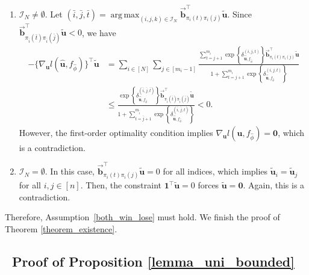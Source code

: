 \documentclass[
  12pt]{article}
\DeclareMathOperator*{\argmax}{arg\,max}
\begin{document}
\begin{enumerate}
\item $\mathcal{I}_N \neq \emptyset$. Let $(\bar{i}, \bar{j}, \bar{t}) = \argmax_{(i,j,k) \in \mathcal{I}_N }  \vec{\mathbf{b}}_{\pi_{i}(t) \pi_{i}(j)}^{\top}   \widetilde{\boldsymbol{u}}$. Since $\vec{\mathbf{b}}_{\pi_{\bar{i}}(\bar{t}) \pi_{\bar{i}}(\bar{j})}^{\top} \widetilde{\boldsymbol{u}}<0$,  we have $$\begin{aligned}
-\{\nabla_{\boldsymbol{u}} l(\widehat{\boldsymbol{u}}, f_{\widehat{\phi}})\}^{\top} \widetilde{\boldsymbol{u}} & =\sum_{i \in[N]} \sum_{j \in\left[m_i-1\right]} \frac{\sum_{t=j+1}^{m_i} \exp \left\{\delta_{\widehat{\boldsymbol{u}}, f_{\widehat{\phi}}}^{(i, j, t)}\right\} \vec{\mathbf{b}}_{\pi_{i}(t) \pi_{i}(j)}^{\top}   \widetilde{\boldsymbol{u}}}{1+\sum_{t=j+1}^{m_i} \exp \left\{\delta_{\widehat{\boldsymbol{u}}, f_{\widehat{\phi}}}^{(i, j, t)}\right\}} \\
& \leq\frac{\exp \left\{\delta_{\widehat{\boldsymbol{u}}, f_{\widehat{\phi}}}^{(\bar{i}, \bar{j}, \bar{t})}\right\} \vec{\mathbf{b}}_{\pi_{\bar{i}}(\bar{t}) \pi_{\bar{i}}(\bar{j})}^{\top}  \widetilde{\boldsymbol{u}}}{1+\sum_{t=\bar{j}+1}^{m_{\bar{i}}} \exp \left\{\delta_{\widehat{\boldsymbol{u}}, f_{\widehat{\phi}}}^{(\bar{i}, \bar{j}, t)}\right\}}<0.
\end{aligned}$$
However, the first-order optimality condition implies $\nabla_{\boldsymbol{u}}l(\widehat{\boldsymbol{u}}, f_{\widehat{\phi}})=\boldsymbol{0}$, which is a contradiction.
\item $\mathcal{I}_N = \emptyset$. In this case, $ \vec{\mathbf{b}}_{\pi_{i}(t) \pi_{i}(j)}^{\top}   \widetilde{\boldsymbol{u}} = 0$ for all indices, which implies $\widetilde{\boldsymbol{u}}_i=\widetilde{\boldsymbol{u}}_j$ for all $i,j\in[n]$. Then, the constraint $\mathbf{1}^{\top} \widetilde{\boldsymbol{u}}=0$ forces $\widetilde{\boldsymbol{u}}=\mathbf{0}$. Again, this is a contradiction.
\end{enumerate}
Therefore, Assumption~\ref{both_win_lose} must hold. We finish the proof of Theorem \ref{theorem_existence}.




\subsection{~Proof of Proposition \ref{lemma_uni_bounded}}
\end{document}
